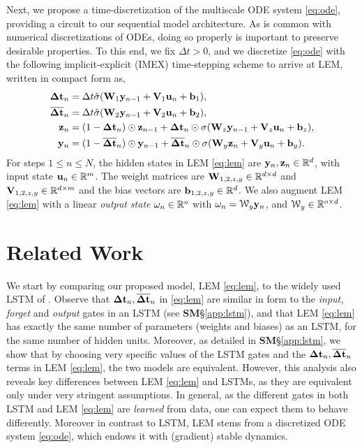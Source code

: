 \documentclass{article} \usepackage{iclr2022_conference,times}
\newcommand{\by}{{\bf y}}
\newcommand{\bz}{{\bf z}}
\newcommand{\bW}{{\bf W}}
\newcommand{\bu}{{\bf u}}
\newcommand{\bb}{{\bf b}}
\newcommand{\bV}{{\bf V}}
\newcommand{\R}{{\mathbb R}}
\newcommand{\Dt}{{\Delta t}}
\newcommand{\cW}{\EuScript{W}}
\newcommand{\bom}{{\bf \omega}}
\begin{document}
Next, we propose a time-discretization of the multiscale ODE system \eqref{eq:ode}, providing a circuit to our sequential model architecture. As is common with numerical discretizations of ODEs, doing so properly is important to preserve desirable properties. 
To this end, we fix $\Dt > 0$, and we discretize \eqref{eq:ode} with the following implicit-explicit (IMEX) time-stepping scheme to arrive at LEM, written in compact form as, 
\begin{equation}
    \label{eq:lem}
    \begin{aligned}
    {\bf \Dt}_n &= \Dt\hat{\sigma}(\bW_1\by_{n-1} + \bV_1\bu_{n} + \bb_1),  \\ {\bf \overline{\Dt}}_n &= \Dt\hat{\sigma}(\bW_2\by_{n-1} + \bV_2\bu_{n} + \bb_2),\\
    \bz_n &= (1 - {\bf \Dt}_n)\odot\bz_{n-1} + {\bf \Dt}_n \odot \sigma(\bW_z \by_{n-1} + \bV_z \bu_{n} + \bb_z), \\
    \by_n &= (1 - {\bf \overline{\Dt}}_n)\odot\by_{n-1} + {\bf \overline{\Dt}}_n\odot\sigma(\bW_y \bz_{n} + \bV_y \bu_{n} + \bb_y).
\end{aligned}
\end{equation}
For steps $1 \leq n \leq N$, the hidden states in LEM \eqref{eq:lem} are $\by_n,\bz_n \in \R^d$, with input state $\bu_n \in \R^m$. The weight matrices are $\bW_{1,2,z,y} \in \R^{d\times d}$ and $\bV_{1,2,z,y} \in \R^{d\times m}$ and the bias vectors are $\bb_{1,2,z,y} \in \R^d$. We also augment LEM \eqref{eq:lem} with a linear \emph{output state} $\bom_n \in \R^o$ with $\bom_n =\cW_y \by_n$, and $\cW_y \in \R^{o\times d}$.


\section{Related Work} 
\label{sxn:related}

We start by comparing our proposed model, LEM \eqref{eq:lem}, to the widely used LSTM of \citet{lstm}.
Observe that ${\bf \Dt}_n,\overline{\bf \Dt}_n$ in \eqref{eq:lem} are similar in form to the \emph{input, forget} and \emph{output} gates in an LSTM (see {\bf SM}\S\ref{app:lstm}), and that LEM \eqref{eq:lem} has exactly the same number of parameters (weights and biases) as an LSTM, for the same number of hidden units. 
Moreover, as detailed in {\bf SM}\S\ref{app:lstm}, we show that by choosing very specific values of the LSTM gates and the ${\bf \Dt}_n,{\bf \overline{\Dt}}_n$ terms in LEM \eqref{eq:lem}, the two models are equivalent. 
However, this analysis also reveals key differences between LEM \eqref{eq:lem} and LSTMs, as they are equivalent only under very stringent assumptions. 
In general, as the different gates in both LSTM and LEM \eqref{eq:lem} are \emph{learned} from data, one can expect them to behave differently. 
Moreover in contrast to LSTM, LEM stems from a discretized ODE system \eqref{eq:ode}, which endows it with (gradient) stable dynamics.  
\end{document}

